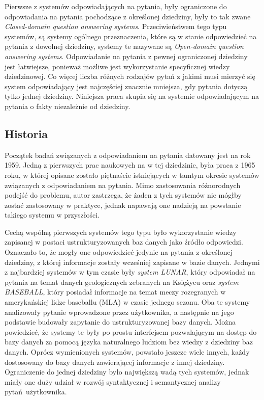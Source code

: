 \documentclass[a4paper, twoside, 12pt]{report}
\begin{document}
            Pierwsze z systemów odpowiadających na pytania, były ograniczone do odpowiadania na pytania pochodzące z
            określonej dziedziny, były to tak zwane \emph{Closed-domain question answering systems}. Przeciwieństwem
            tego typu systemów, są systemy ogólnego przeznaczenia, które są w stanie odpowiedzieć na pytania z dowolnej
            dziedziny, systemy te nazywane są \emph{Open-domain question answering systems}. Odpowiadanie
            na pytania z pewnej ograniczonej dziedziny jest łatwiejsze, ponieważ możliwe jest wykorzystanie specyficznej
            wiedzy dziedzinowej. Co więcej liczba różnych rodzajów pytań z jakimi musi mierzyć się system odpowiadający
            jest najczęściej znacznie mniejsza, gdy pytania dotyczą tylko jednej dziedziny. Niniejsza praca skupia się
            na systemie odpowiadającym na pytania o fakty niezależnie od dziedziny.

        \subsection{Historia}
            Początek badań związanych z odpowiadaniem na pytania datowany jest na rok 1959. Jedną z pierwszych prac
            naukowych na w tej dziedzinie, była praca z 1965 roku\cite{FIRSTWORKQA}, w której opisane zostało piętnaście
            istniejących w tamtym okresie systemów związanych z odpowiadaniem na pytania. Mimo zastosowania różnorodnych
            podejść do problemu, autor zastrzega, że żaden z tych systemów nie mógłby zostać zastosowany w praktyce,
            jednak napawają one nadzieją na powstanie takiego systemu w przyszłości.

            Cechą wspólną pierwszych systemów tego typu było wykorzystanie wiedzy zapisanej w postaci ustrukturyzowanych
            baz danych jako źródło odpowiedzi. Oznaczało to, że mogły one odpowiedzieć jedynie na pytania z określonej
            dziedziny, z której informacje zostały wcześniej zapisane w bazie danych. Jednymi z najbardziej systemów
            w tym czasie były \emph{system LUNAR}\cite{LUNAR}, który odpowiadał na pytania na temat danych geologicznych
            zebranych na Księżycu oraz \emph{system BASEBALL}\cite{BASEBALL}, który posiadał informacje na temat meczy rozegranych w
            amerykańskiej lidze baseballu (MLA) w czasie jednego sezonu. Oba te systemy analizowały pytanie wprowadzone
            przez użytkownika, a następnie na jego podstawie budowały zapytanie do ustrukturyzowanej bazy danych. Można
            powiedzieć, że systemy te były po prostu interfejsem pozwalającym na dostęp do bazy danych za pomocą języka
            naturalnego ludziom bez wiedzy z dziedziny baz danych. Oprócz wymienionych systemów, powstało jeszcze wiele
            innych, każdy dostosowany do bazy danych zawierającej informacje z innej dziedziny. Ograniczenie do jednej
            dziedziny było największą wadą tych systemów, jednak miały one duży udział w rozwój syntaktycznej i
            semantycznej analizy pytań użytkownika\cite{QASURVEY}.
\end{document}
